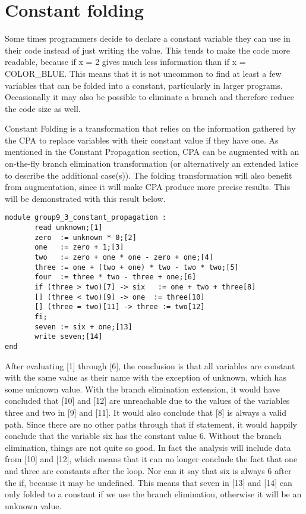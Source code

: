 \section{Constant folding}
Some times programmers decide to declare a constant variable they can use
in their code instead of just writing the value. This tends to make the
code more readable, because if x = 2 gives much less information than
if x = COLOR_BLUE.
  This means that it is not uncommon to find at least a few variables
that can be folded into a constant, particularly in larger programs.
Occasionally it may also be possible to eliminate a branch and therefore
reduce the code size as well.  

\docpar
Constant Folding is a transformation that relies on the information
gathered by the CPA to replace variables with their constant value
if they have one.
  As mentioned in the Constant Propagation section,
CPA can be augmented with an on-the-fly branch elimination transformation
(or alternatively an extended latice to describe the additional case(s)).
The folding transformation will also benefit from augmentation, since it
will make CPA produce more precise results. This will be demonstrated with
this result below.

\begin{lstlisting}
module group9_3_constant_propagation :
       read unknown;[1]
       zero  := unknown * 0;[2]
       one   := zero + 1;[3]
       two   := zero + one * one - zero + one;[4]
       three := one + (two + one) * two - two * two;[5]
       four  := three * two - three + one;[6]
       if (three > two)[7] -> six   := one + two + three[8]
       [] (three < two)[9] -> one  := three[10]
       [] (three = two)[11] -> three := two[12]
       fi;
       seven := six + one;[13]
       write seven;[14]
end
\end{lstlisting}

\docpar
After evaluating [1] through [6], the conclusion is that all variables are constant
with the same value as their name with the exception of unknown, which has some
unknown value. 
  With the branch elimination extension, it would have concluded that [10] and
[12] are unreachable due to the values of the variables three and two in [9] and
[11]. It would also conclude that [8] is always a valid path. Since there are
no other paths through that if statement, it would happily conclude that the
variable six has the constant value 6.
  Without the  branch elimination, things are not quite so good. In fact the
analysis will include data from [10] and [12], which means that it can no
longer conclude the fact that one and three are constants after the loop.
Nor can it say that six is always 6 after the if, because it may be undefined.
  This means that seven in [13] and [14] can only folded to a constant if we
use the branch elimination, otherwise it will be an unknown value.

